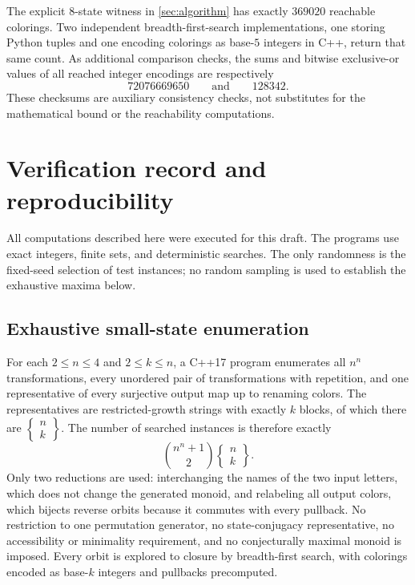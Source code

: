 \documentclass[11pt,a4paper]{article}
\numberwithin{equation}{section}
\theoremstyle{definition}
\theoremstyle{remark}
\newcommand{\stirling}[2]{\left\{\!\begin{matrix}#1\\#2\end{matrix}\!\right\}}
\begin{document}
The explicit $8$-state witness in \cref{sec:algorithm} has exactly $369020$
reachable colorings. Two independent breadth-first-search implementations,
one storing Python tuples and one encoding colorings as base-$5$ integers in
C++, return that same count. As additional comparison checks, the sums and
bitwise exclusive-or values of all reached integer encodings are respectively
\[
 72076669650\qquad\text{and}\qquad128342.
\]
These checksums are auxiliary consistency checks, not substitutes for the
mathematical bound or the reachability computations.

\section{Verification record and reproducibility}\label{sec:verification}

All computations described here were executed for this draft. The programs
use exact integers, finite sets, and deterministic searches. The only
randomness is the fixed-seed selection of test instances; no random sampling
is used to establish the exhaustive maxima below.

\subsection{Exhaustive small-state enumeration}\label{sec:exhaustive}

For each $2\le n\le4$ and $2\le k\le n$, a C++17 program enumerates all
$n^n$ transformations, every unordered pair of transformations with
repetition, and one representative of every surjective output map up to
renaming colors. The representatives are restricted-growth strings with
exactly $k$ blocks, of which there are $\stirling{n}{k}$. The number of
searched instances is therefore exactly
\begin{equation}\label{eq:cases}
 \binom{n^n+1}{2}\stirling{n}{k}.
\end{equation}
Only two reductions are used: interchanging the names of the two input
letters, which does not change the generated monoid, and relabeling all
output colors, which bijects reverse orbits because it commutes with every
pullback. No restriction to one permutation generator, no state-conjugacy
representative, no accessibility or minimality requirement, and no
conjecturally maximal monoid is imposed. Every orbit is explored to closure
by breadth-first search, with colorings encoded as base-$k$ integers and
pullbacks precomputed.
\end{document}
